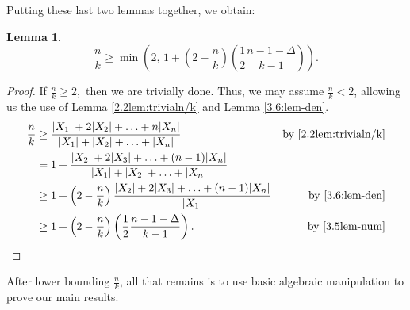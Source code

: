 \documentclass{amsart}
\newcommand{\1}{\mathds{1}}
\newtheorem{lemma}[theorem]{Lemma}
\numberwithin{theorem}{section}
\newcommand{\Xsum}{|X_1|+|X_2|+\ldots+|X_n|}
\newcommand{\wXsum}{|X_1|+2|X_2|+\ldots +n|X_n|}
\begin{document}
Putting these last two lemmas together, we obtain:
\begin{lemma}\label{3.7lem:bound} %
    $$\frac n k \geq \min \left(2,\, 1+\left(2-\frac{n}{k}\right)\left(\frac{1}{2}\frac{n-1-\Delta}{k-1}\right)\right).$$
\end{lemma} 
\begin{proof}
If $\frac n k \geq 2,$ then we are trivially done. Thus, we may assume $\frac n k < 2$, allowing us the use of Lemma \ref{2.2lem:trivialn/k} and Lemma \ref{3.6:lem-den}.
    \begin{align*}
        \frac{n}{k} &\geq \frac{\wXsum}{\Xsum}  & \text{by \ref{2.2lem:trivialn/k}}
        \\ & = 1+\frac{|X_2|+2|X_3|+\ldots +(n-1)|X_n|}{\Xsum} 
        \\&\geq 1+ \left(2-\frac{n}{k}\right) \frac{|X_2|+2|X_3|+\ldots+ (n-1)|X_n|}{|X_1|} &\text{by \ref{3.6:lem-den}}
        \\& \geq 1+\left(2-\frac{n}{k}\right)\left(\frac{1}{2}\frac{n-1-\Delta}{k-1}\right). &\text{by \ref{3.5lem-num}}
    \end{align*}
\end{proof}
After lower bounding $\frac{n}{k}$, all that remains is to use basic algebraic manipulation to prove our main results.
\end{document}
